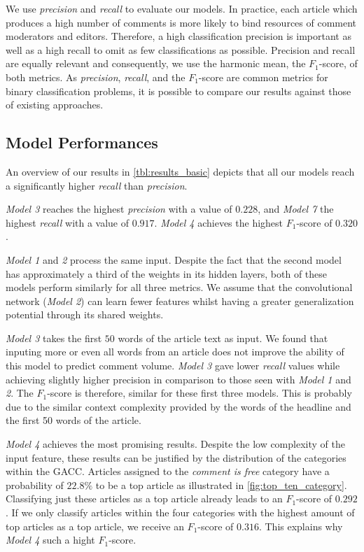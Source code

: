 We use \textit{precision} and \textit{recall} to evaluate our models. 
In practice, each article which produces a high number of comments is more likely to bind resources of comment moderators and editors.
Therefore, a high classification precision is important as well as a high recall to omit as few classifications as possible.
Precision and recall are equally relevant and consequently, we use the harmonic mean, the $F_1$-score, of both metrics. As \textit{precision}, \textit{recall}, and the $F_1$-score are common metrics for binary classification problems, it is possible to compare our results against those of existing approaches.

\subsection{Model Performances}
An overview of our results in \autoref{tbl:results_basic} depicts that all our models reach a significantly higher \textit{recall} than \textit{precision}.

\textit{Model 3} reaches the highest \textit{precision} with a value of $0.228$, and \textit{Model 7} the highest \textit{recall} with a value of $0.917$. \textit{Model 4} achieves the highest $F_1$-score of $0.320$. 



\textit{Model 1} and \textit{2} process the same input. Despite the fact that the second model has approximately a third of the weights in its hidden layers, both of these models perform similarly for all three metrics.
We assume that the convolutional network (\textit{Model 2}) can learn fewer features whilst having a greater generalization potential through its shared weights.

\textit{Model 3} takes the first $50$ words of the article text as input. 
We found that inputing more or even all words from an article does not improve the ability of this model to predict comment volume.
\textit{Model 3} gave lower \textit{recall} values while achieving slightly higher precision in comparison to those seen with \textit{Model 1} and \textit{2}. 
The $F_1$-score is therefore, similar for these first three models.
This is probably due to the similar context complexity provided by the words of the headline and the first 50 words of the article.

\textit{Model 4} achieves the most promising results. 
Despite the low complexity of the input feature, these results can be justified by the distribution of the categories within the GACC. 
Articles assigned to the \textit{comment is free} category have a probability of $22.8\%$ to be a top article as illustrated in \autoref{fig:top_ten_category}. 
Classifying just these articles as a top article already leads to an $F_1$-score of $0.292$.
If we only classify articles within the four categories with the highest amount of top articles as a top article, we receive an $F_1$-score of $0.316$. 
This explains why \textit{Model 4} such a hight $F_1$-score.

